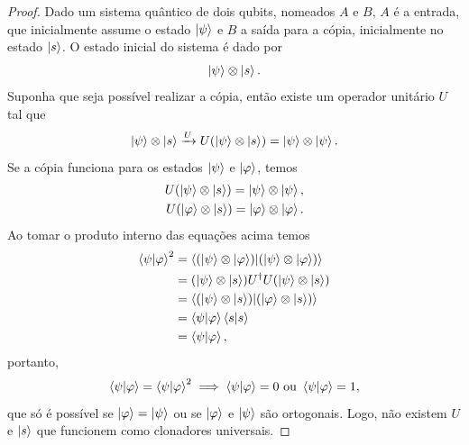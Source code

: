 \begin{theorem}
    \begin{proof}
        Dado um sistema quântico de dois qubits, nomeados $A$ e $B$, $A$ é a entrada, que inicialmente assume o estado $\ket{\psi}$ e $B$ a saída para a cópia, inicialmente no estado $\ket{s}$. O estado inicial do sistema é dado por
        \begin{equation}
            \ket{\psi}\otimes \ket{s}.
        \end{equation}
        Suponha que seja possível realizar a cópia, então existe um operador unitário $U$ tal que
        \begin{equation}
            \ket{\psi}\otimes\ket{s} \xrightarrow{U} U(\ket{\psi}\otimes\ket{s}) = \ket{\psi}\otimes\ket{\psi}.
        \end{equation}
        Se a cópia funciona para os estados $\ket{\psi}$ e $\ket{\varphi}$, temos
            \begin{align}
                U(\ket{\psi}\otimes\ket{s}) = \ket{\psi}\otimes\ket{\psi}, \\
                U(\ket{\varphi}\otimes\ket{s}) = \ket{\varphi}\otimes\ket{\varphi}.
            \end{align}
        Ao tomar o produto interno das equações acima temos
        \begin{align}
            \braket{\psi|\varphi}^2 &= \braket{(\ket{\psi}\otimes\ket{\varphi})|(\ket{\psi}\otimes\ket{\varphi})} \\
                                    &= (\ket{\psi}\otimes \ket{s}) U^\dagger U(\ket{\psi}\otimes\ket{s}) \\
                                    &= \braket{(\ket{\psi}\otimes\ket{s})|(\ket{\varphi}\otimes\ket{s})} \\
                                    &= \braket{\psi|\varphi}\braket{s|s} \\
                                    &= \braket{\psi|\varphi},
        \end{align}
        portanto,
        \begin{equation}
            \braket{\psi|\varphi} =\braket{\psi|\varphi}^2 \implies \braket{\psi|\varphi}=0 \text{ ou } \braket{\psi|\varphi}=1,
        \end{equation}
        que só é possível se $\ket{\varphi}=\ket{\psi}$ ou se $\ket{\varphi}$ e $\ket{\psi}$ são ortogonais. Logo, não existem $U$ e $\ket{s}$ que funcionem  como clonadores universais.
    \end{proof}
\end{theorem}

